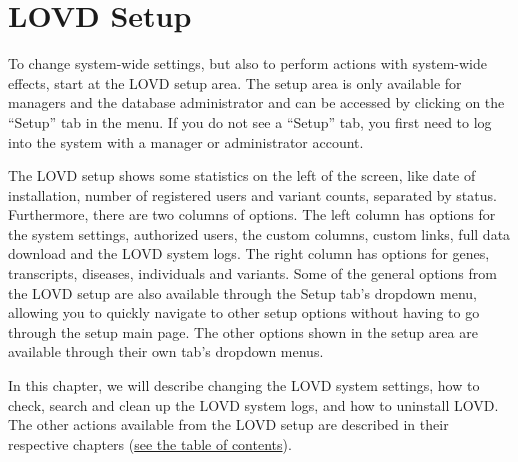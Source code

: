 \documentclass[a4paper,oneside,openany,12pt]{memoir}
\begin{document}
\hypertarget{c_setup}{}
\chapter{LOVD Setup}

To change system-wide settings, but also to perform actions with system-wide effects, start at the LOVD setup area.
The setup area is only available for managers and the database administrator and can be accessed by clicking on the ``Setup'' tab in the menu.
If you do not see a ``Setup'' tab, you first need to log into the system with a manager or administrator account.
\\
\par
The LOVD setup shows some statistics on the left of the screen, like date of installation, number of registered users and variant counts, separated by status.
Furthermore, there are two columns of options.
The left column has options for the system settings, authorized users, the custom columns, custom links, full data download and the LOVD system logs.
The right column has options for genes, transcripts, diseases, individuals and variants.
Some of the general options from the LOVD setup are also available through the Setup tab's dropdown menu, allowing you to quickly navigate to other setup options without having to go through the setup main page.
The other options shown in the setup area are available through their own tab's dropdown menus.
\\
\par
In this chapter, we will describe changing the LOVD system settings, how to check, search and clean up the LOVD system logs, and how to uninstall LOVD.
The other actions available from the LOVD setup are described in their respective chapters (\hyperlink{toc}{see the table of contents}).





\end{document}
